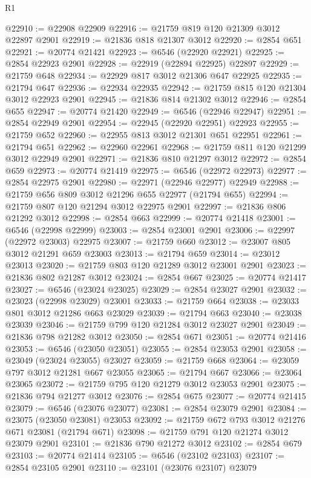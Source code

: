 \begin{lexlean}{R1}
\begin{coremodule}
@22910 := @22908 @22909
@22916 := @21759 @819 @120 @21309 @3012 @22897 @2901
@22919 := @21836 @818 @21307 @3012
@22920 := @2854 @651
@22921 := @20774 @21421
@22923 := @6546 (@22920 @22921)
@22925 := @2854 @22923 @2901
@22928 := @22919 (@22894 @22925) @22897
@22929 := @21759 @648
@22934 := @22929 @817 @3012 @21306 @647 @22925
@22935 := @21794 @647
@22936 := @22934 @22935
@22942 := @21759 @815 @120 @21304 @3012 @22923 @2901
@22945 := @21836 @814 @21302 @3012
@22946 := @2854 @655
@22947 := @20774 @21420
@22949 := @6546 (@22946 @22947)
@22951 := @2854 @22949 @2901
@22954 := @22945 (@22920 @22951) @22923
@22955 := @21759 @652
@22960 := @22955 @813 @3012 @21301 @651 @22951
@22961 := @21794 @651
@22962 := @22960 @22961
@22968 := @21759 @811 @120 @21299 @3012 @22949 @2901
@22971 := @21836 @810 @21297 @3012
@22972 := @2854 @659
@22973 := @20774 @21419
@22975 := @6546 (@22972 @22973)
@22977 := @2854 @22975 @2901
@22980 := @22971 (@22946 @22977) @22949
@22988 := @21759 @656 @809 @3012 @21296 @655 @22977 (@21794 @655)
@22994 := @21759 @807 @120 @21294 @3012 @22975 @2901
@22997 := @21836 @806 @21292 @3012
@22998 := @2854 @663
@22999 := @20774 @21418
@23001 := @6546 (@22998 @22999)
@23003 := @2854 @23001 @2901
@23006 := @22997 (@22972 @23003) @22975
@23007 := @21759 @660
@23012 := @23007 @805 @3012 @21291 @659 @23003
@23013 := @21794 @659
@23014 := @23012 @23013
@23020 := @21759 @803 @120 @21289 @3012 @23001 @2901
@23023 := @21836 @802 @21287 @3012
@23024 := @2854 @667
@23025 := @20774 @21417
@23027 := @6546 (@23024 @23025)
@23029 := @2854 @23027 @2901
@23032 := @23023 (@22998 @23029) @23001
@23033 := @21759 @664
@23038 := @23033 @801 @3012 @21286 @663 @23029
@23039 := @21794 @663
@23040 := @23038 @23039
@23046 := @21759 @799 @120 @21284 @3012 @23027 @2901
@23049 := @21836 @798 @21282 @3012
@23050 := @2854 @671
@23051 := @20774 @21416
@23053 := @6546 (@23050 @23051)
@23055 := @2854 @23053 @2901
@23058 := @23049 (@23024 @23055) @23027
@23059 := @21759 @668
@23064 := @23059 @797 @3012 @21281 @667 @23055
@23065 := @21794 @667
@23066 := @23064 @23065
@23072 := @21759 @795 @120 @21279 @3012 @23053 @2901
@23075 := @21836 @794 @21277 @3012
@23076 := @2854 @675
@23077 := @20774 @21415
@23079 := @6546 (@23076 @23077)
@23081 := @2854 @23079 @2901
@23084 := @23075 (@23050 @23081) @23053
@23092 := @21759 @672 @793 @3012 @21276 @671 @23081 (@21794 @671)
@23098 := @21759 @791 @120 @21274 @3012 @23079 @2901
@23101 := @21836 @790 @21272 @3012
@23102 := @2854 @679
@23103 := @20774 @21414
@23105 := @6546 (@23102 @23103)
@23107 := @2854 @23105 @2901
@23110 := @23101 (@23076 @23107) @23079

\end{coremodule}
\end{lexlean}
